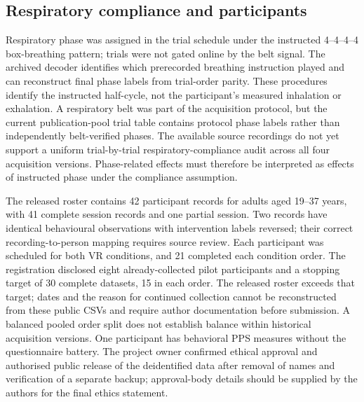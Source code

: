 \subsection{Respiratory compliance and participants}

Respiratory phase was assigned in the trial schedule under the instructed 4--4--4--4 box-breathing pattern; trials were not gated online by the belt signal. The archived decoder identifies which prerecorded breathing instruction played and can reconstruct final phase labels from trial-order parity. These procedures identify the instructed half-cycle, not the participant's measured inhalation or exhalation. A respiratory belt was part of the acquisition protocol, but the current publication-pool trial table contains protocol phase labels rather than independently belt-verified phases. The available source recordings do not yet support a uniform trial-by-trial respiratory-compliance audit across all four acquisition versions. Phase-related effects must therefore be interpreted as effects of instructed phase under the compliance assumption.

The released roster contains 42 participant records for adults aged 19--37 years, with 41 complete session records and one partial session. Two records have identical behavioural observations with intervention labels reversed; their correct recording-to-person mapping requires source review. Each participant was scheduled for both VR conditions, and 21 completed each condition order. The registration disclosed eight already-collected pilot participants and a stopping target of 30 complete datasets, 15 in each order. The released roster exceeds that target; dates and the reason for continued collection cannot be reconstructed from these public CSVs and require author documentation before submission. A balanced pooled order split does not establish balance within historical acquisition versions. One participant has behavioral PPS measures without the questionnaire battery. The project owner confirmed ethical approval and authorised public release of the deidentified data after removal of names and verification of a separate backup; approval-body details should be supplied by the authors for the final ethics statement.
